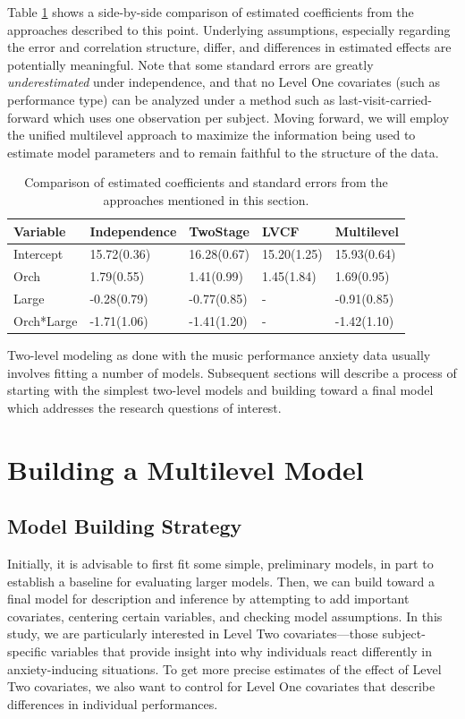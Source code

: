 \documentclass[
]{krantz}
\begin{document}
Table \ref{tab:table3chp8} shows a side-by-side comparison of estimated coefficients from the approaches described to this point. Underlying assumptions, especially regarding the error and correlation structure, differ, and differences in estimated effects are potentially meaningful. Note that some standard errors are greatly \emph{underestimated} under independence, and that no Level One covariates (such as performance type) can be analyzed under a method such as last-visit-carried-forward which uses one observation per subject. Moving forward, we will employ the unified multilevel approach to maximize the information being used to estimate model parameters and to remain faithful to the structure of the data.

\begin{table}

\caption{\label{tab:table3chp8}Comparison of estimated coefficients and standard errors from the approaches mentioned in this section.}
\centering
\begin{tabular}[t]{lllll}
\toprule
Variable & Independence & TwoStage & LVCF & Multilevel\\
\midrule
Intercept & 15.72(0.36) & 16.28(0.67) & 15.20(1.25) & 15.93(0.64)\\
Orch & 1.79(0.55) & 1.41(0.99) & 1.45(1.84) & 1.69(0.95)\\
Large & -0.28(0.79) & -0.77(0.85) & - & -0.91(0.85)\\
Orch*Large & -1.71(1.06) & -1.41(1.20) & - & -1.42(1.10)\\
\bottomrule
\end{tabular}
\end{table}

Two-level modeling as done with the music performance anxiety data usually involves fitting a number of models. Subsequent sections will describe a process of starting with the simplest two-level models and building toward a final model which addresses the research questions of interest.

\section{Building a Multilevel Model}\label{sec:buildmodel}

\subsection{Model Building Strategy}\label{buildstrategy}

Initially, it is advisable to first fit some simple, preliminary models, in part to establish a baseline for evaluating larger models. Then, we can build toward a final model for description and inference by attempting to add important covariates, centering certain variables, and checking model assumptions. In this study, we are particularly interested in Level Two covariates---those subject-specific variables that provide insight into why individuals react differently in anxiety-inducing situations. To get more precise estimates of the effect of Level Two covariates, we also want to control for Level One covariates that describe differences in individual performances.
\end{document}
